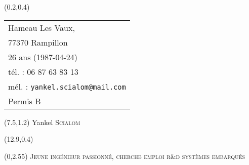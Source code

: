 \documentclass[10pt]{article}
\newcommand{\emphcolor}{NavyBlue}
\newcommand{\cemph}[1]{{\color{\emphcolor} #1}}
\begin{document}
\thispagestyle{empty}

\begin{textblock}{7}(0.2,0.4)
	\begin{tabular}{l}
		\small
		Hameau Les Vaux,\\ 77370 Rampillon\\
		26 ans (1987-04-24)\\
		tél. : 06 87 63 83 13\\
		mél. : \texttt{yankel.scialom@mail.com}\\
		Permis B
	\end{tabular}
\end{textblock}

\begin{textblock}{7}(7.5,1.2)
	{\Huge Yankel \textsc{Scialom}}
	
	\vspace{1em}
\end{textblock}

\begin{textblock}{7}(12.9,0.4)
	{\color{\emphcolor}}
\end{textblock}


\begin{textblock}{16}(0,2.55)
	\centering
	\fontsize{15pt}{18pt}\selectfont
	\cemph{\textsc{Jeune ingénieur passionné, cherche emploi r\&d systèmes embarqués}}
\end{textblock}

\end{document}
